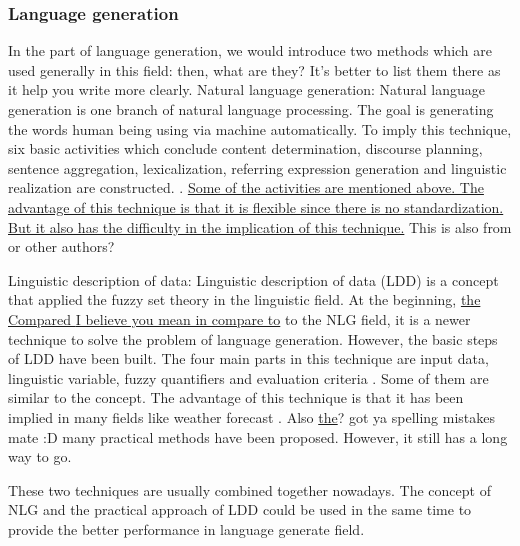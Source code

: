 \subsubsection*{Language generation}
In the part of language generation, we would introduce two methods which are used generally in this field: then, what are they? It's better to list them there as it help you write more clearly.
Natural language generation: Natural language generation is one branch of natural language processing. The goal is generating the words human being using via machine automatically. To imply this technique, six basic activities which conclude content determination, discourse planning, sentence aggregation, lexicalization, referring expression generation and linguistic realization are constructed. \cite{aramossoto2016onthe}. \underline{Some of the activities are mentioned above. The advantage of this technique is that it is flexible since there is no standardization. But it also has the difficulty in the implication of this technique.} This is also from \cite{aramossoto2016onthe} or other authors?

Linguistic description of data: Linguistic description of data (LDD) is a concept that applied the fuzzy set theory in the linguistic field. At the beginning, \underline{the Compared } \underline{I believe you mean in compare to} to the NLG field, it is a newer technique to solve the problem of language generation. However, the basic steps of LDD have been built. The four main parts in this technique are input data, linguistic variable, fuzzy quantifiers and evaluation criteria \cite{aramossoto2016onthe}. Some of them are similar to the concept. The advantage of this technique is that it has been implied in many fields like weather forecast \cite{Ramos-SotoBBT14}. Also \underline{the}? got ya spelling mistakes mate :D many practical methods have been proposed. However, it still has a long way to go.

These two techniques are usually combined together nowadays. The concept of NLG and the practical approach of LDD could be used in the same time to provide the better performance in language generate field.

\newpage %